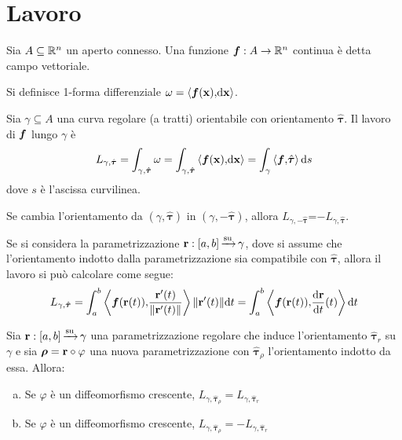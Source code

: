 \section{Lavoro}

\begin{definition}
	Sia $A\subseteq \mathbb{R}^n$ un aperto connesso. Una funzione $\bm f: A \to \mathbb{R}^n$ continua è detta campo vettoriale.
\end{definition}

\begin{definition}
	\label{def:1form}
	Si definisce 1-forma differenziale $\omega=\left\langle\bm f(\vb{x}){,}\dd \vb{x}\right\rangle$.
\end{definition}

\begin{definition}
	[Lavoro]
	Sia $\gamma \subseteq A$ una curva regolare (a tratti) orientabile con orientamento $\hat{\bm\tau}$. Il lavoro di $\bm f$ lungo $\gamma$ è
	$$
		L_{\gamma,\hat{\bm\tau}}=\int_{\gamma,\hat{\bm\tau}}\omega=\int_{\gamma, \hat{\bm\tau}}\left\langle\bm f(\vb{x}){,}\dd \vb{x}\right\rangle=\int_\gamma \left\langle\bm f{,}\hat{\bm\tau}\right\rangle\dd s
	$$
	dove $s$ è l'ascissa curvilinea.
\end{definition}

\begin{remark}
	Se cambia l'orientamento da $(\gamma, \hat{\bm\tau})$ in $(\gamma, -\hat{\bm\tau})$, allora $L_{\gamma,-\hat{\bm\tau}}$=$-L_{\gamma,\hat{\bm\tau}}$.
\end{remark}

Se si considera la parametrizzazione $\vb{r}: [a,b]\operatorname{\xrightarrow{\operatorname{su}}} \gamma$, dove si assume che l'orientamento indotto dalla parametrizzazione sia compatibile con $\hat{\bm\tau}$, allora il lavoro si può calcolare come segue:
$$
	L_{\gamma, \hat{\bm\tau}}
	=\int_{a}^{b}\left\langle\bm f(\vb{r}(t)){,}\frac{\vb{r}'(t)}{\norm{\vb{r}'(t)}}\right\rangle\norm{\vb{r}'(t)}\dd t
	=\int_a^b\left\langle\bm f(\vb{r} (t)){,}\frac{\dd \vb{r}}{\dd t} (t)\right\rangle\dd t
$$

\begin{theorem}
	Sia $\vb{r}:[a,b]\operatorname{\xrightarrow{\operatorname{su}}} \gamma$ una parametrizzazione regolare che induce l'orientamento $\hat{\bm\tau}_r$ su $\gamma$ e sia $\bm\rho = \vb{r} \circ \varphi$ una nuova parametrizzazione con $\hat{\bm\tau}_\rho$ l'orientamento indotto da essa. Allora:
	\begin{enumerate} [a.]
		\item Se $\varphi$ è un diffeomorfismo crescente, $L_{\gamma, \hat{\bm\tau}_\rho} = L_{\gamma, \hat{\bm\tau}_r}$
		\item Se $\varphi$ è un diffeomorfismo crescente, $L_{\gamma, \hat{\bm\tau}_\rho} = -L_{\gamma, \hat{\bm\tau}_r}$
	\end{enumerate}
\end{theorem}

